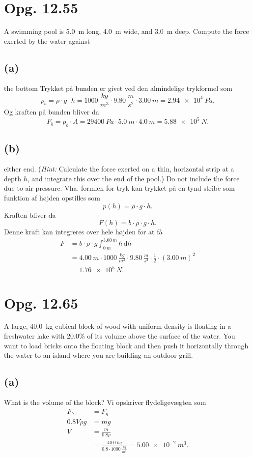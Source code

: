 \documentclass[12pt]{article}
\theoremstyle{definition}
\begin{document}
\section*{Opg. 12.55}
A swimming pool is \qty{5,0}{m} long, \qty{4,0}{m} wide, and \qty{3,0}{m} deep. Compute the force exerted by the water against

\subsection*{(a)}
the bottom
\bigbreak
Trykket på bunden er givet ved den almindelige trykformel som
\[ 
p_{b} = \rho \cdot g \cdot h = \qty{1000}{\frac{kg}{m^3}} \cdot \qty{9.80}{\frac{m}{s^2}} \cdot \qty{3,00}{m} = \qty{2,94e4}{Pa}
.\]
Og kraften på bunden bliver da
\[ 
F_{b} = p_b \cdot A = \qty{29400}{Pa} \cdot \qty{5.0}{m} \cdot \qty{4.0}{m} = \qty{5,88e5}{N} 
.\]


\subsection*{(b)}
either end. (\textit{Hint:} Calculate the force exerted on a thin, horizontal strip at a depth $h$, and integrate this over the end of the pool.) Do not include the force due to air pressure.
\bigbreak
Vha. formlen for tryk kan trykket på en tynd stribe som funktion af højden opstilles som
\[ 
p(h) = \rho \cdot g \cdot h 
.\]
Kraften bliver da
\[ 
F(h) = b \cdot \rho \cdot g \cdot h
.\]
Denne kraft kan integreres over hele højden for at få
\begin{align*}
  F &= b \cdot \rho \cdot g \int_{\qty{0}{m}}^{\qty{3,00}{m}} h \, \mathrm{d}h \\
  &= \qty{4,00}{m} \cdot \qty{1000}{\frac{kg}{m^3}} \cdot \qty{9.80}{\frac{m}{s^2}} \cdot \frac{1}{2}\cdot (\qty{3,00}{m})^2 \\
  &= \qty{1,76e5}{N} 
.\end{align*}


\section*{Opg. 12.65}
A large, \qty{40,0}{kg} cubical block of wood with uniform density is floating in a freshwater lake with \num{20,0}\% of its volume above the surface of the water. You want to load bricks onto the floating block and then push it horizontally through the water to an island where you are building an outdoor grill.

\subsection*{(a)}
What is the volume of the block?
\bigbreak
Vi opskriver flydeligevægten som
\begin{align*}
  F_b &= F_g \\
  \num{0.8} V \rho g &= mg \\
  V &= \frac{m}{\num{0.8} \rho} \\
    &= \frac{\qty{40,0}{kg}}{\num{0.8} \cdot \qty{1000}{\frac{kg}{m^3}}} = \qty{5,00e-2}{m^3} 
.\end{align*}
\end{document}
